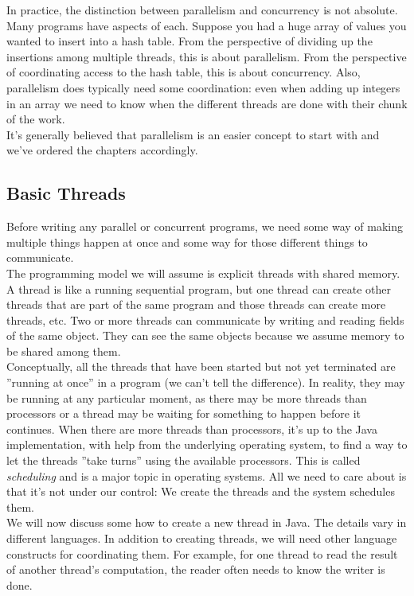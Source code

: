 \documentclass[main]{subfiles}
\begin{document}
In practice, the distinction between parallelism and concurrency is not absolute.  Many programs have aspects of each. Suppose you had a huge array of values you wanted to insert into a hash table. From the perspective of dividing up the insertions among multiple threads, this is about parallelism. From the perspective of coordinating access to the hash table, this is about concurrency. Also, parallelism does typically need some coordination: even when adding up integers in an array we need to know when the different threads are done with their chunk of the work.\\[3mm]
It's generally believed that parallelism is an easier concept to start with and we've ordered the chapters accordingly.

\subsection{Basic Threads}
Before writing any parallel or concurrent programs, we need some way of making multiple things happen at once and some way for those different things to communicate.\\[3mm]
The programming model we will assume is explicit threads with shared memory. A thread is like a running sequential program, but one thread can create other threads that are part of the same program and those threads can create more threads, etc. Two or more threads can communicate by writing and reading fields of the same object. They can see the same objects because we assume memory to be shared among them.\\[3mm]
Conceptually, all the threads that have been started but not yet terminated are ''running at once'' in a program (we can't tell the difference). In reality, they may be running at any particular moment, as there may be more threads than processors or a thread may be waiting for something to happen before it continues. When there are more threads than processors, it's up to the Java implementation, with help from the underlying operating system, to find a way to let the threads ''take turns'' using the available processors. This is called \textit{scheduling} and is a major topic in operating systems. All we need to care about is that it's not under our control: We create the threads and the system schedules them.\\[3mm]
We will now discuss some how to create a new thread in Java. The details vary in different languages. In addition to creating threads, we will need other language constructs for coordinating them. For example, for one thread to read the result of another thread's computation, the reader often needs to know the writer is done.\\[3mm]
\end{document}
